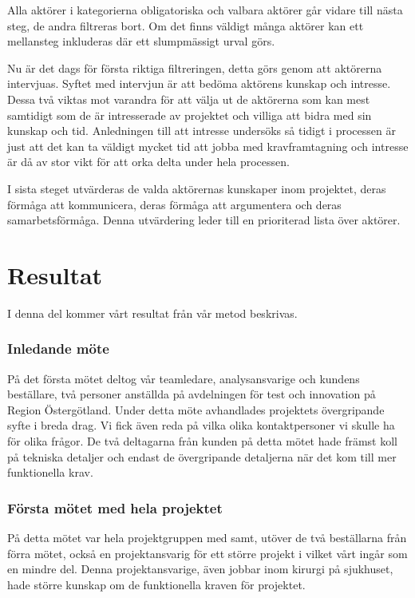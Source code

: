 Alla aktörer i kategorierna obligatoriska och valbara aktörer går vidare till nästa steg, de andra filtreras bort. Om det finns väldigt många aktörer kan ett mellansteg inkluderas där ett slumpmässigt urval görs.

Nu är det dags för första riktiga filtreringen, detta görs genom att aktörerna intervjuas. Syftet med intervjun är att bedöma aktörens kunskap och intresse. Dessa två viktas mot varandra för att välja ut de aktörerna som kan mest samtidigt som de är intresserade av projektet och villiga att bidra med sin kunskap och tid. Anledningen till att intresse undersöks så tidigt i processen är just att det kan ta väldigt mycket tid att jobba med kravframtagning och intresse är då av stor vikt för att orka delta under hela processen.

I sista steget utvärderas de valda aktörernas kunskaper inom projektet, deras förmåga att kommunicera, deras förmåga att argumentera och deras samarbetsförmåga. Denna utvärdering leder till en prioriterad lista över aktörer.

\section{Resultat}
I denna del kommer vårt resultat från vår metod beskrivas.

\subsubsection{Inledande möte}
På det första mötet deltog vår teamledare, analysansvarige och kundens beställare, två personer anställda på avdelningen för test och innovation på Region Östergötland. Under detta möte avhandlades projektets övergripande syfte i breda drag.
Vi fick även reda på vilka olika kontaktpersoner vi skulle ha för olika frågor. De två deltagarna från kunden på detta mötet hade främst koll på tekniska detaljer och endast de övergripande detaljerna när det kom till mer funktionella krav.

\subsubsection{Första mötet med hela projektet}
På detta mötet var hela projektgruppen med samt, utöver de två beställarna från förra mötet, också en projektansvarig för ett större projekt i vilket vårt ingår som en mindre del. Denna projektansvarige, även jobbar inom kirurgi på sjukhuset, hade större kunskap om de funktionella kraven för projektet.

